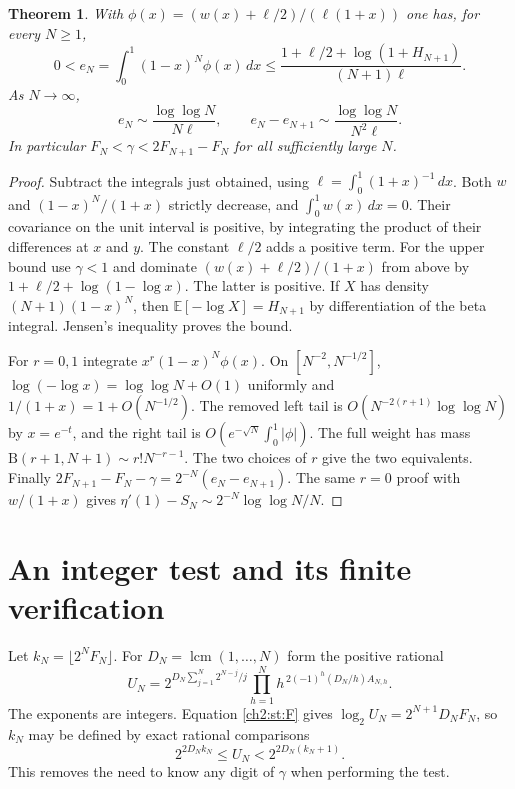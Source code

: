\documentclass[11pt,a4paper,oneside,openany]{report}
\newtheorem{theorem}{Theorem}[section]
\theoremstyle{remark}\newtheorem{remark}[theorem]{Remark}
\numberwithin{equation}{section}
\begin{document}
\begin{theorem}\label{ch2:st:error}
With $\phi(x)=(w(x)+\ell/2)/(\ell(1+x))$ one has, for every $N\ge1$,
\[
 0< e_N=\int_0^1(1-x)^N\phi(x)\,dx
 \le \frac{1+\ell/2+\log(1+H_{N+1})}{(N+1)\ell}.
\]
As $N\to\infty$,
\[
 e_N\sim\frac{\log\log N}{N\ell},\qquad
 e_N-e_{N+1}\sim\frac{\log\log N}{N^2\ell}.
\]
In particular $F_N<\gamma<2F_{N+1}-F_N$ for all sufficiently large $N$.
\end{theorem}
\begin{proof}
Subtract the integrals just obtained, using $\ell=\int_0^1(1+x)^{-1}\,dx$. Both $w$ and $(1-x)^N/(1+x)$ strictly decrease, and $\int_0^1w(x)\,dx=0$. Their covariance on the unit interval is positive, by integrating the product of their differences at $x$ and $y$. The constant $\ell/2$ adds a positive term. For the upper bound use $\gamma<1$ and dominate $(w(x)+\ell/2)/(1+x)$ from above by $1+\ell/2+\log(1-\log x)$. The latter is positive. If $X$ has density $(N+1)(1-x)^N$, then $\mathbb E[-\log X]=H_{N+1}$ by differentiation of the beta integral. Jensen's inequality proves the bound.

For $r=0,1$ integrate $x^r(1-x)^N\phi(x)$. On $[N^{-2},N^{-1/2}]$, $\log(-\log x)=\log\log N+O(1)$ uniformly and $1/(1+x)=1+O(N^{-1/2})$. The removed left tail is $O(N^{-2(r+1)}\log\log N)$ by $x=e^{-t}$, and the right tail is $O(e^{-\sqrt N}\int_0^1|\phi|)$. The full weight has mass $\mathrm B(r+1,N+1)\sim r!N^{-r-1}$. The two choices of $r$ give the two equivalents. Finally $2F_{N+1}-F_N-\gamma=2^{-N}(e_N-e_{N+1})$. The same $r=0$ proof with $w/(1+x)$ gives $\eta'(1)-S_N\sim 2^{-N}\log\log N/N$.
\end{proof}
\section{An integer test and its finite verification}
Let $k_N=\lfloor 2^N F_N\rfloor$. For $D_N=\operatorname{lcm}(1,\ldots,N)$ form the positive rational
\[
 U_N=2^{D_N\sum_{j=1}^N 2^{N-j}/j}
       \prod_{h=1}^N h^{\,2(-1)^h(D_N/h)A_{N,h}}.
\]
The exponents are integers. Equation \eqref{ch2:st:F} gives $\log_2 U_N=2^{N+1}D_N F_N$, so $k_N$ may be defined by exact rational comparisons
\[
 2^{2D_N k_N}\le U_N<2^{2D_N(k_N+1)} .
\]
This removes the need to know any digit of $\gamma$ when performing the test.
\end{document}
